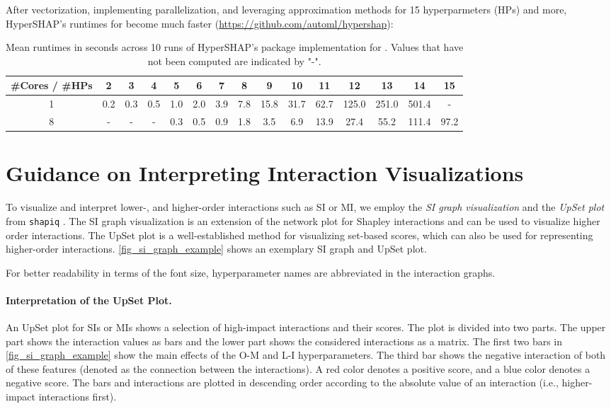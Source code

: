 \documentclass[letterpaper]{article} %
\begin{document}
After vectorization, implementing parallelization, and leveraging approximation methods for 15 hyperparmeters (HPs) and more, HyperSHAP's runtimes for \dstunability become much faster (\url{https://github.com/automl/hypershap}):

\begin{table}[h]
    \centering
    \caption{Mean runtimes in seconds across 10 runs of HyperSHAP's package implementation for \dstunability. Values that have not been computed are indicated by "-".}
    \label{tab:runtimes-package}
    \begin{tabular}{c|c|c|c|c|c|c|c|c|c|c|c|c|c|c}
        \toprule
        \#Cores / \#HPs & 2 & 3 & 4 & 5 & 6 & 7 & 8 & 9 & 10 & 11 & 12 & 13 & 14 & 15 \\
        \midrule
         1 &  0.2 & 0.3 & 0.5 & 1.0 & 2.0 & 3.9 & 7.8 & 15.8 & 31.7 & 62.7 & 125.0 & 251.0 & 501.4 & - \\
         8 & - & - & - & 0.3 & 0.5 & 0.9 & 1.8 & 3.5 & 6.9 & 13.9 & 27.4 & 55.2 & 111.4 & 97.2\\
         \bottomrule
    \end{tabular}
\end{table}

\section{Guidance on Interpreting Interaction Visualizations}\label{appx_guidance}

To visualize and interpret lower-, and higher-order interactions such as \gls*{SI} or \gls*{MI}, we employ the \emph{SI graph visualization} and the \emph{UpSet plot} from \texttt{shapiq} \citep{Muschalik.2024}.
The SI graph visualization is an extension of the network plot for Shapley interactions \cite{DBLP:conf/aaai/MuschalikFHH24} and can be used to visualize higher order interactions.
The UpSet plot \cite{Lex2014UpSet} is a well-established method for visualizing set-based scores, which can also be used for representing higher-order interactions.
\cref{fig_si_graph_example} shows an exemplary SI graph and UpSet plot.

For better readability in terms of the font size, hyperparameter names are abbreviated in the interaction graphs.

\paragraph{Interpretation of the UpSet Plot.}
An UpSet plot for \glspl*{SI} or \glspl*{MI} shows a selection of high-impact interactions and their scores. The plot is divided into two parts. The upper part shows the interaction values as bars and the lower part shows the considered interactions as a matrix. The first two bars in \cref{fig_si_graph_example} show the main effects of the O-M and L-I hyperparameters. The third bar shows the negative interaction of both of these features (denoted as the connection between the interactions).
A red color denotes a positive score, and a blue color denotes a negative score.
The bars and interactions are plotted in descending order according to the absolute value of an interaction (i.e., higher-impact interactions first).
\end{document}
